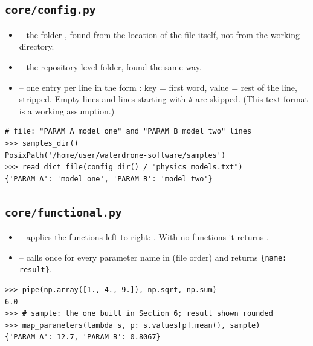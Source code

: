 \documentclass{article}
\begin{document}
\subsection{\texttt{core/config.py}}

\begin{itemize}
\item {} -- the folder ,
      found from the location of the file itself, not from the working
      directory.
\item {} -- the repository-level
       folder, found the same way.
\item {} -- one entry per line in
      the form : key = first word, value = rest of the
      line, stripped. Empty lines and lines starting with \verb|#| are
      skipped. (This text format is a working assumption.)
\end{itemize}

\begin{lstlisting}
# file: "PARAM_A model_one" and "PARAM_B model_two" lines
>>> samples_dir()
PosixPath('/home/user/waterdrone-software/samples')
>>> read_dict_file(config_dir() / "physics_models.txt")
{'PARAM_A': 'model_one', 'PARAM_B': 'model_two'}
\end{lstlisting}

\subsection{\texttt{core/functional.py}}

\begin{itemize}
\item {} -- applies the functions left to right:
      . With no functions it returns
      .
\item {} -- calls
       once for every parameter name in
       (file order) and returns \verb|{name: result}|.
\end{itemize}

\begin{lstlisting}
>>> pipe(np.array([1., 4., 9.]), np.sqrt, np.sum)
6.0
>>> # sample: the one built in Section 6; result shown rounded
>>> map_parameters(lambda s, p: s.values[p].mean(), sample)
{'PARAM_A': 12.7, 'PARAM_B': 0.8067}
\end{lstlisting}
\end{document}
